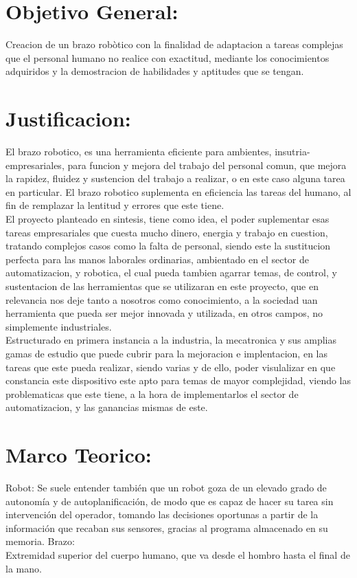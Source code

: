 \documentclass[14pt,a4paper]{article}
\begin{document}
\newpage

\section{Objetivo General:}

Creacion de un brazo robòtico con la finalidad de adaptacion a tareas complejas que el personal humano no realice con exactitud, mediante los conocimientos adquiridos y la demostracion de habilidades y aptitudes que se tengan.

\section{Justificacion:}

El brazo robotico, es una herramienta eficiente para ambientes, insutria-empresariales, para funcion y mejora del trabajo del personal comun, que mejora la rapidez, fluidez y sustencion del trabajo a realizar, o en este caso alguna tarea en particular. El brazo robotico suplementa en eficiencia las tareas del humano, al fin de remplazar la lentitud y errores que este tiene.\\
El proyecto planteado en sintesis, tiene como idea, el  poder suplementar esas tareas empresariales que cuesta mucho dinero, energia y trabajo en cuestion, tratando complejos casos como la falta de personal, siendo este la sustitucion perfecta para las manos laborales ordinarias, ambientado en el sector de automatizacion, y robotica, el cual pueda tambien agarrar temas, de control, y sustentacion de las herramientas que se utilizaran en este proyecto, que en relevancia nos deje tanto a nosotros como conocimiento, a la sociedad uan herramienta que pueda ser mejor innovada y utilizada, en otros campos, no simplemente industriales.\\
Estructurado en primera instancia a la industria, la mecatronica y sus amplias gamas de estudio que puede cubrir para la mejoracion e implentacion, en las tareas que este pueda realizar, siendo varias y de ello, poder visulalizar en que constancia este dispositivo este apto para temas de mayor complejidad, viendo las problematicas que este tiene, a la  hora de implementarlos el sector de automatizacion, y las ganancias mismas de este.

\section{Marco Teorico:}

Robot:
Se suele entender también que un robot goza de un elevado grado de autonomía y de autoplanificación, de modo que es capaz de hacer su tarea sin intervención del operador, tomando las decisiones oportunas a partir de la información que recaban sus sensores, gracias al programa almacenado en su memoria.
Brazo:\\
Extremidad superior del cuerpo humano, que va desde el hombro hasta el final de la mano.\\
\end{document}
